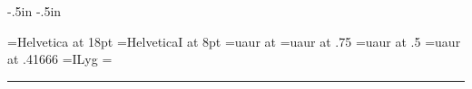 
\newdimen\basesize
\newdimen\dist
\newdimen\baseblsk
\newdimen\xheight
\newdimen\ascheight
\newdimen\leading
\newdimen\adjust
\newcount\scratch
\newcount\scppt {}
\newcount\intgp
\newcount\sscratch
\newcount\fracp

 \hoffset-.5in
 \voffset-.5in

\nopagenumbers
\parindent0pt

\def\setuptype#1#2#3#4{\font\bigtext=#3 at 18pt
\basesize=#2
\font\tinynote=#4 at 8pt
\font\bigdisp=#1 at \basesize
\font\meddisp=#1 at .75\basesize
\font\smalldisp=#1 at .5\basesize
\font\tinydisp=#1 at .41666\basesize
\setbox0=\vbox{\bigdisp ILyg}
\baseblsk=\ht0
\advance\baseblsk\dp0
\baseblsk=1.2\baseblsk}

\def\setleading{\setbox0=\hbox{x}
\xheight=\ht0
\setbox0=\hbox{Ilpgy}
\ascheight=\ht0
\leading=\ht0
\adjust=\xheight \advance\adjust-.5\leading
\advance\leading\dp0
\leading=1.175\leading  
\ifdim\dp0<.05\ht0 \advance\adjust.5\xheight\fi
\advance\leading by \adjust
\baselineskip\leading}

\def\prettypt#1{\dist=#1
\multiply\dist10
\scratch=\number\dist
\divide\scratch\scppt
\intgp=\scratch \divide\intgp10
\sscratch=\intgp 
\multiply\sscratch10 \advance\scratch-\sscratch
\fracp=\scratch
\hbox{\the\intgp.\the\fracp}pt\ }


\setuptype{uaur}{24pt}{Helvetica}{HelveticaI}


\smallskip

\hrule
\smallskip
{}
\bigskip


